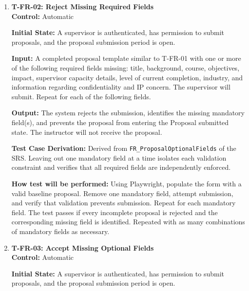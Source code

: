 \documentclass[12pt, titlepage]{article}
\begin{document}
\begin{enumerate}
\textbf{How test will be performed:} Using Playwright, authenticate as a supervisor, populate the proposal form with the predefined values, and submit it. Verify the confirmation and SUBMITTED status. Then, authenticate as an instructor and confirm that the proposal is accessible with the correct information.

\item \label{T-FR-02}\textbf{T-FR-02: Reject Missing Required Fields}\\

\textbf{Control:} Automatic
					
\textbf{Initial State:} A supervisor is authenticated, has permission to submit proposals, and the proposal submission period is open.
					
\textbf{Input:} A completed proposal template similar to T-FR-01 with one or more of the following required fields missing: title, background, course, objectives, impact, supervisor capacity details, level of current completion, industry, and information regarding confidentiality and IP concern. The supervisor will submit. Repeat for each of the following fields.
					
\textbf{Output:} The system rejects the submission, identifies the missing mandatory field(s), and prevents the proposal from entering the Proposal submitted state. The instructor will not receive the proposal.

\textbf{Test Case Derivation:} Derived from \texttt{FR\_ProposalOptionalFields} of the SRS. Leaving out one mandatory field at a time isolates each validation constraint and verifies that all required fields are independently enforced.

\textbf{How test will be performed:} Using Playwright, populate the form with a valid baseline proposal. Remove one mandatory field, attempt submission, and verify that validation prevents submission. Repeat for each mandatory field. The test passes if every incomplete proposal is rejected and the corresponding missing field is identified. Repeated with as many combinations of mandatory fields as necessary.

\item \label{T-FR-03}\textbf{T-FR-03: Accept Missing Optional Fields}\\

\textbf{Control:} Automatic
					
\textbf{Initial State:} A supervisor is authenticated, has permission to submit proposals, and the proposal submission period is open.
					

\end{enumerate}
\end{document}
